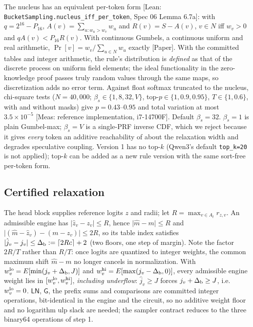 \documentclass[10pt]{article}
\begin{document}
The nucleus has an equivalent per-token form [Lean: \texttt{BucketSampling.\allowbreak{}nucleus\_\allowbreak{}iff\_\allowbreak{}per\_\allowbreak{}token}, Spec 06 Lemma 6.7a]: with $q=2^{16}-P_{16}$, $A(v)=\sum_{u:w_u>w_v}w_u$ and $R(v)=S-A(v)$, $v\in N$ iff $w_v>0$ and $qA(v)<P_{16}R(v)$. With continuous Gumbels, a continuous uniform and real arithmetic, $\Pr[v]=w_v/\sum_{u\in N}w_u$ exactly [Paper]. With the committed tables and integer arithmetic, the rule's distribution is \emph{defined} as that of the discrete process on uniform field elements; the ideal functionality in the zero-knowledge proof passes truly random values through the same maps, so discretization adds no error term. Against float softmax truncated to the nucleus, chi-square tests ($N=40{,}000$; $\beta_s\in\{1,8,32,V\}$, top-$p\in\{1,0.9,0.95\}$, $T\in\{1,0.6\}$, with and without masks) give $p=0.43$--$0.95$ and total variation at most $3.5\times10^{-5}$ [Meas: reference implementation, i7-14700F]. Default $\beta_s=32$. $\beta_s=1$ is plain Gumbel-max; $\beta_s=V$ is a single-PRF inverse CDF, which we reject because it gives \emph{every} token an additive reachability of about the relaxation width and degrades speculative coupling. Version 1 has no top-$k$ (Qwen3's default \texttt{top\_\allowbreak{}k=20} is not applied); top-$k$ can be added as a new rule version with the same sort-free per-token form.

\subsection{Certified relaxation}
The head block supplies reference logits $z$ and radii; let $R=\max_{v\in A_t}r_{z,v}$. An admissible engine has $\lvert\hat z_v-z_v\rvert\le R$, hence $\lvert\hat m-m\rvert\le R$ and $\lvert(\hat m-\hat z_v)-(m-z_v)\rvert\le2R$, so its table index satisfies $\lvert\hat j_v-j_v\rvert\le\Delta_{\rm b}:=\lceil2Rc\rceil+2$ (two floors, one step of margin). Note the factor $2R/T$ rather than $R/T$: once logits are quantized to integer weights, the common maximum shift $\hat m-m$ no longer cancels in normalization. With $w^{\rm lo}_v=E[\min(j_v+\Delta_{\rm b},J)]$ and $w^{\rm hi}_v=E[\max(j_v-\Delta_{\rm b},0)]$, every admissible engine weight lies in $[w^{\rm lo}_v,w^{\rm hi}_v]$, \emph{including underflow}: $\hat j_v\ge J$ forces $j_v+\Delta_{\rm b}\ge J$, i.e. $w^{\rm lo}_v=0$. $\mathsf{LN}$, $\mathsf G$, the prefix sums and comparisons are committed integer operations, bit-identical in the engine and the circuit, so no additive weight floor and no logarithm ulp slack are needed; the sampler contract reduces to the three binary64 operations of step 1.
\end{document}
